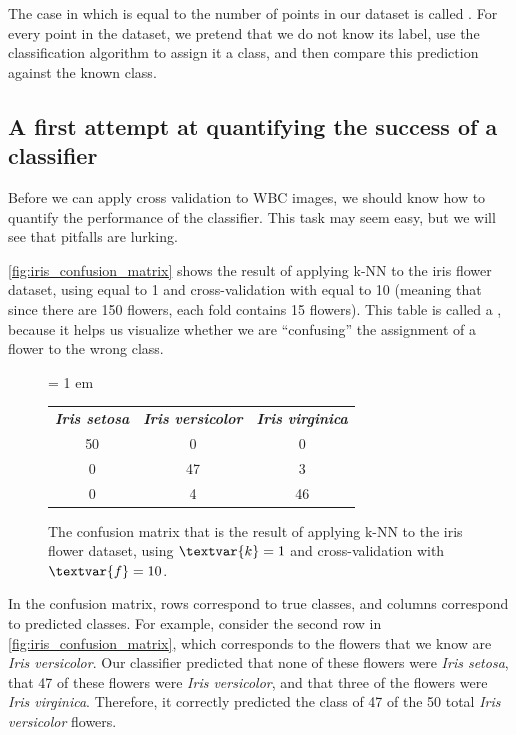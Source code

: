 The case in which  is equal to the number of points in our dataset is called . For every point in the dataset, we pretend that we do not know its label, use the classification algorithm to assign it a class, and then compare this prediction against the known class.

\FloatBarrier
{}
\subsection{A first attempt at quantifying the success of a classifier}

Before we can apply cross validation to WBC images, we should know how to quantify the performance of the classifier. This task may seem easy, but we will see that pitfalls are lurking.

\autoref{fig:iris_confusion_matrix} shows the result of applying k-NN to the iris flower dataset, using  equal to 1 and cross-validation with  equal to 10 (meaning that since there are 150 flowers, each fold contains 15 flowers). This table is called a , because it helps us visualize whether we are ``confusing'' the assignment of a flower to the wrong class.\\

\begin{figure}[h]
\centering
\tabcolsep = 1 em
\mySfFamily
{}
\begin{tabular}{c c c}
\rowcolor{gray!50}
\textbf{\textit{Iris setosa}} & \textbf{\textit{Iris versicolor}} & \textbf{\textit{Iris virginica}} \\
50 & 0 & 0 \\
0 & 47 & 3 \\
0 & 4 & 46
\end{tabular}
\caption{The confusion matrix that is the result of applying k-NN to the iris flower dataset, using $\textvar{k} = \text{1}$ and cross-validation with $\textvar{f} = \text{10}$.}
\label{fig:iris_confusion_matrix}
\end{figure}

In the confusion matrix, rows correspond to true classes, and columns correspond to predicted classes. For example, consider the second row in \autoref{fig:iris_confusion_matrix}, which corresponds to the flowers that we know are \textit{Iris versicolor}. Our classifier predicted that none of these flowers were \textit{Iris setosa}, that 47 of these flowers were \textit{Iris versicolor}, and that three of the flowers were \textit{Iris virginica}. Therefore, it correctly predicted the class of 47 of the 50 total \textit{Iris versicolor} flowers.\\

